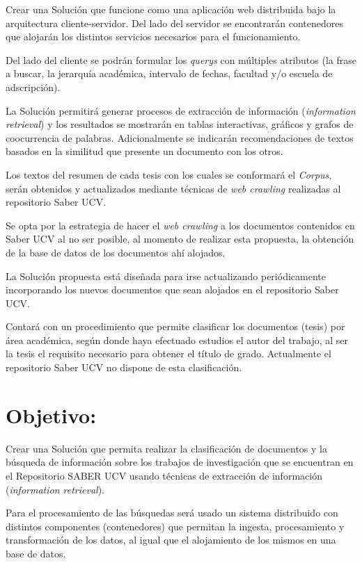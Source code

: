 \documentclass[
  10,
  openany]{book}
\begin{document}
Crear una Solución que funcione como una aplicación web distribuida bajo la arquitectura cliente-servidor. Del lado del servidor se encontrarán contenedores que alojarán los distintos servicios necesarios para el funcionamiento.

Del lado del cliente se podrán formular los \emph{querys} con múltiples atributos (la frase a buscar, la jerarquía académica, intervalo de fechas, facultad y/o escuela de adscripción).

La Solución permitirá generar procesos de extracción de información (\emph{information retrieval}) y los resultados se mostrarán en tablas interactivas, gráficos y grafos de coocurrencia de palabras. Adicionalmente se indicarán recomendaciones de textos basados en la similitud que presente un documento con los otros.

Los textos del resumen de cada tesis con los cuales se conformará el \emph{Corpus}, serán obtenidos y actualizados mediante técnicas de \emph{web crawling} realizadas al repositorio Saber UCV.

Se opta por la estrategia de hacer el \emph{web crawling} a los documentos contenidos en Saber UCV al no ser posible, al momento de realizar esta propuesta, la obtención de la base de datos de los documentos ahí alojados.

La Solución propuesta está diseñada para irse actualizando periódicamente incorporando los nuevos documentos que sean alojados en el repositorio Saber UCV.

Contará con un procedimiento que permite clasificar los documentos (tesis) por área académica, según donde haya efectuado estudios el autor del trabajo, al ser la tesis el requisito necesario para obtener el título de grado. Actualmente el repositorio Saber UCV no dispone de esta clasificación.

\hypertarget{objetivogral}{%
\section{Objetivo:}\label{objetivogral}}

Crear una Solución que permita realizar la clasificación de documentos y la búsqueda de información sobre los trabajos de investigación que se encuentran en el Repositorio SABER UCV usando técnicas de extracción de información (\emph{information retrieval}).

Para el procesamiento de las búsquedas será usado un sistema distribuido con distintos componentes (contenedores) que permitan la ingesta, procesamiento y transformación de los datos, al igual que el alojamiento de los mismos en una base de datos.
\end{document}
